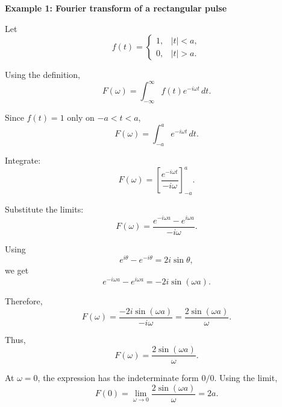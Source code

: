 \begin{examplebox}
    \textbf{Example 1: Fourier transform of a rectangular pulse}

    Let
    \[
        f(t)=
        \begin{cases}
            1, & |t|<a, \\
            0, & |t|>a.
        \end{cases}
    \]

    Using the definition,
    \[
        F(\omega)
        =
        \int_{-\infty}^{\infty}f(t)e^{-i\omega t}\,dt.
    \]

    Since $f(t)=1$ only on $-a<t<a$,
    \[
        F(\omega)
        =
        \int_{-a}^{a}e^{-i\omega t}\,dt.
    \]

    Integrate:
    \[
        F(\omega)
        =
        \left[
            \frac{e^{-i\omega t}}{-i\omega}
            \right]_{-a}^{a}.
    \]

    Substitute the limits:
    \[
        F(\omega)
        =
        \frac{e^{-i\omega a}-e^{i\omega a}}{-i\omega}.
    \]

    Using
    \[
        e^{i\theta}-e^{-i\theta}=2i\sin\theta,
    \]
    we get
    \[
        e^{-i\omega a}-e^{i\omega a}
        =
        -2i\sin(\omega a).
    \]

    Therefore,
    \[
        F(\omega)
        =
        \frac{-2i\sin(\omega a)}{-i\omega}
        =
        \frac{2\sin(\omega a)}{\omega}.
    \]

    Thus,
    \[
        \boxed{
            F(\omega)=\frac{2\sin(\omega a)}{\omega}
        }.
    \]

    At $\omega=0$, the expression has the indeterminate form $0/0$. Using the limit,
    \[
        F(0)=\lim_{\omega\to 0}\frac{2\sin(\omega a)}{\omega}=2a.
    \]
\end{examplebox}


